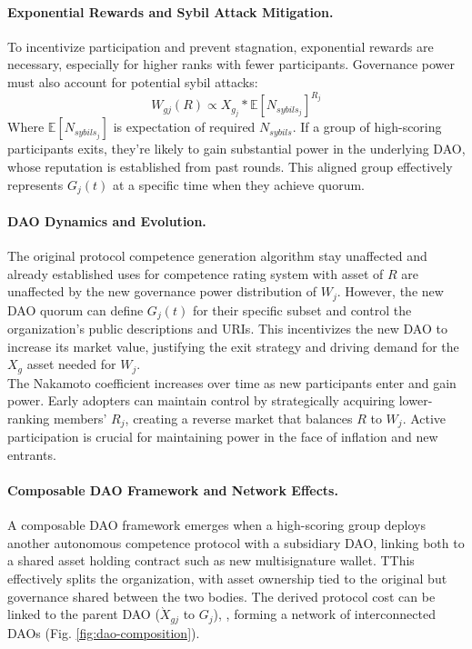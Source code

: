 \documentclass{article}
\begin{document}
\begin{CJK}{UTF8}{gbsn}
\begin{multicols}{2}
            \paragraph{Exponential Rewards and Sybil Attack Mitigation.}
            To incentivize participation and prevent stagnation, exponential rewards are necessary, especially for higher ranks with fewer participants. Governance power must also account for potential sybil attacks:
            \begin{equation}
                W_{gj}(R) \propto  X_{g_j}*\mathbb{E}[N_{sybils_j}]^{R_j}
            \end{equation}
            Where $\mathbb{E}[N_{sybils_j}]$ is expectation of required $N_{sybils}$. If a group of high-scoring participants exits, they're likely to gain substantial power in the underlying DAO, whose reputation is established from past rounds. This aligned group effectively represents $G_j(t)$  at a specific time when they achieve quorum.

            \paragraph{DAO Dynamics and Evolution.} The original protocol competence generation algorithm stay unaffected and already established uses for competence rating system with asset of $R$ are unaffected by the new governance power distribution of $W_j$. However, the new DAO quorum can define $G_j(t)$ for their specific subset and control the organization's public descriptions and URIs. This incentivizes the new DAO to increase its market value, justifying the exit strategy and driving demand for the $X_g$ asset needed for $W_j$.\\
            The Nakamoto coefficient increases over time as new participants enter and gain power. Early adopters can maintain control by strategically acquiring lower-ranking members' $R_{j}$, creating a reverse market that balances $R$ to $W_j$. Active participation is crucial for maintaining power in the face of inflation and new entrants.
            \paragraph{Composable DAO Framework and Network Effects.}
            A composable DAO framework emerges when a high-scoring group deploys another autonomous competence protocol with a subsidiary DAO, linking both to a shared asset holding contract such as new multisignature wallet. TThis effectively splits the organization, with asset ownership tied to the original but governance shared between the two bodies. The derived protocol cost can be linked to the parent DAO ($ \grave{X}_{gj}$ to $G_j$), , forming a network of interconnected DAOs (Fig. \ref{fig:dao-composition}).




\end{multicols}
\end{CJK}
\end{document}
